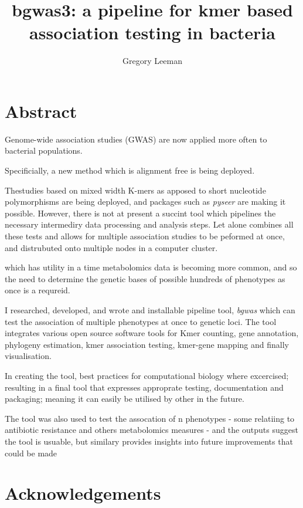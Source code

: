 \documentclass[]{article}
\title{bgwas3: a pipeline for kmer based association testing in bacteria}
\author{Gregory Leeman}
\date{}
\begin{document}
\maketitle

{
\setcounter{tocdepth}{2}
\tableofcontents
}
\hypertarget{abstract}{%
\section{Abstract}\label{abstract}}

Genome-wide association studies (GWAS) are now applied more often to
bacterial populations.

Specificially, a new method which is alignment free is being deployed.

Thestudies based on mixed width K-mers as apposed to short nucleotide
polymorphisms are being deployed, and packages such as \emph{pyseer} are
making it possible. However, there is not at present a succint tool
which pipelines the necessary intermediry data processing and analysis
steps. Let alone combines all these tests and allows for multiple
association studies to be peformed at once, and distrubuted onto
multiple nodes in a computer cluster.

which has utility in a time metabolomics data is becoming more common,
and so the need to determine the genetic bases of possible hundreds of
phenotypes as once is a requreid.

I researched, developed, and wrote and installable pipeline tool,
\emph{bgwas} which can test the association of multiple phenotypes at
once to genetic loci. The tool integrates various open source software
tools for Kmer counting, gene annotation, phylogeny estimation, kmer
association testing, kmer-gene mapping and finally visualisation.

In creating the tool, best practices for computational biology where
excercised; resulting in a final tool that expresses approprate testing,
documentation and packaging; meaning it can easily be utilised by other
in the future.

The tool was also used to test the assocation of n phenotypes - some
relatiing to antibiotic resistance and others metabolomics measures -
and the outputs suggest the tool is usuable, but similary provides
insights into future improvements that could be made

\hypertarget{acknowledgements}{%
\section{Acknowledgements}\label{acknowledgements}}
\end{document}
